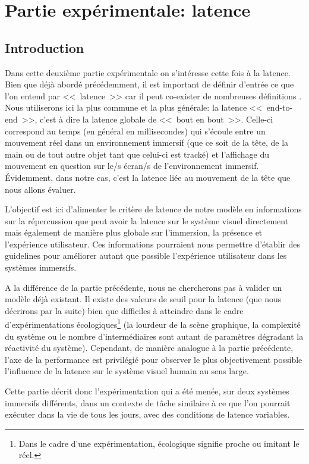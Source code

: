 \part{Partie expérimentale: latence}

\chapter*{Introduction}
\par Dans cette deuxième partie expérimentale on s'intéresse cette fois à la latence. Bien que déjà abordé précédemment, il est important de définir d'entrée ce que l'on entend par <<~latence~>> car il peut co-exister de nombreuses définitions \citep{papadakis_system_2011, hale_handbook_2015, watson_effects_1998}. Nous utiliserons ici la plus commune et la plus générale: la latence <<~end-to-end~>>, c'est à dire la latence globale de <<~bout en bout~>>. Celle-ci correspond au temps (en général en millisecondes) qui s'écoule entre un mouvement réel dans un environnement immersif (que ce soit de la tête, de la main ou de tout autre objet tant que celui-ci est tracké) et l'affichage du mouvement en question sur le/s écran/s de l'environnement immersif. Évidemment, dans notre cas, c'est la latence liée au mouvement de la tête que nous allons évaluer.

\par L'objectif est ici d'alimenter le critère de latence de notre modèle en informations sur la répercussion que peut avoir la latence sur le système visuel directement mais également de manière plus globale sur l'immersion, la présence et l'expérience utilisateur. Ces informations pourraient nous permettre d'établir des guidelines pour améliorer autant que possible l'expérience utilisateur dans les systèmes immersifs.

\par A la différence de la partie précédente, nous ne chercherons pas à valider un modèle déjà existant. Il existe des valeurs de seuil pour la latence (que nous décrirons par la suite) bien que difficiles à atteindre dans le cadre d'expérimentations écologiques\footnote{Dans le cadre d'une expérimentation, écologique signifie proche ou imitant le réel.} (la lourdeur de la scène graphique, la complexité du système ou le nombre d'intermédiaires sont autant de paramètres dégradant la réactivité du système). Cependant, de manière analogue à la partie précédente, l'axe de la performance est privilégié pour observer le plus objectivement possible l'influence de la latence sur le système visuel humain au sens large.

\par Cette partie décrit donc l'expérimentation qui a été menée, sur deux systèmes immersifs différents, dans un contexte de tâche similaire à ce que l'on pourrait exécuter dans la vie de tous les jours, avec des conditions de latence variables.
